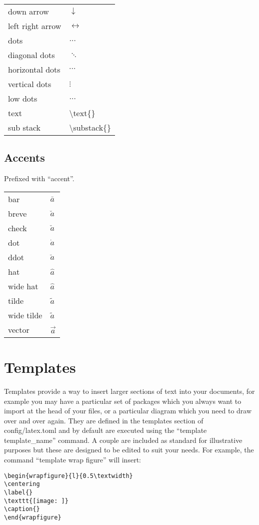 \documentclass[12pt, a4paper]{article}
\begin{document}
\begin{longtable}{ll}
down arrow & $\downarrow$ \\
left right arrow & $\leftrightarrow$ \\
dots & $\dots$ \\
diagonal dots & $\ddots$ \\
horizontal dots & $\cdots$ \\
vertical dots & $\vdots$ \\
low dots & $\ldots$ \\
text & \textbackslash text\{\} \\
sub stack & \textbackslash substack\{\} \\
\end{longtable}

\subsection{Accents}
Prefixed with ``accent''.

\begin{longtable}{ll}
bar & $\bar{a}$ \\
breve & $\breve{a}$ \\
check & $\check{a}$ \\
dot & $\dot{a}$ \\
ddot & $\ddot{a}$ \\
hat & $\hat{a}$ \\
wide hat & $\widehat{a}$ \\
tilde & $\tilde{a}$ \\
wide tilde & $\widetilde{a}$ \\
vector & $\vec{a}$ \\
\end{longtable}

\section{Templates}
Templates provide a way to insert larger sections of text into your documents, for example you may have a particular set of packages which you always want to import at the head of your files, or a particular diagram which you need to draw over and over again. They are defined in the templates section of config/latex.toml and by default are executed using the ``template template\_name'' command. A couple are included as standard for illustrative purposes but these are designed to be edited to suit your needs. For example, the command ``template wrap figure'' will insert:

\begin{verbatim}
\begin{wrapfigure}{l}{0.5\textwidth}
\centering
\label{}
\texttt{[image: ]}
\caption{}
\end{wrapfigure}
\end{verbatim}
\end{document}
